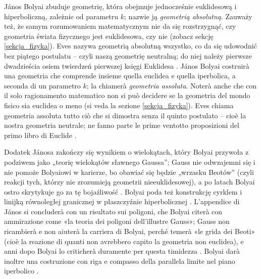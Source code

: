 János Bolyai zbuduje geometrię, która obejmuje jednocześnie euklidesową i hiperboliczną, zależnie od parametru $k$; nazwie ją \emph{geometrią absolutną}. %
Zauważy też, że samym rozumowaniem matematycznym nie da się rozstrzygnąć, czy geometria świata fizycznego jest euklidesowa, czy nie (zobacz sekcję \ref{sekcja_fizyka}). %
Eves nazywa geometrią absolutną wszystko, co da się udowodnić bez piątego postulatu -- czyli naszą geometrię neutralną; do niej należy pierwsze dwadzieścia osiem twierdzeń pierwszej księgi Euklidesa \cite[s. 288]{eves1_1972}. %
János Bolyai costruirà una geometria che comprende insieme quella euclidea e quella iperbolica, a seconda di un parametro $k$; la chiamerà \emph{geometria assoluta}. %
Noterà anche che con il solo ragionamento matematico non si può decidere se la geometria del mondo fisico sia euclidea o meno (si veda la sezione \ref{sekcja_fizyka}). %
Eves chiama geometria assoluta tutto ciò che si dimostra senza il quinto postulato -- cioè la nostra geometria neutrale; ne fanno parte le prime ventotto proposizioni del primo libro di Euclide \cite[p. 288]{eves1_1972}. %

Dodatek Jánosa zakończy się wynikiem o wielokątach, który Bolyai przywoła z podziwem jako „teorię wielokątów sławnego Gaussa''; Gauss nie odwzajemni się i nie pomoże Bolyaiowi w karierze, bo obawiać się będzie „wrzasku Beotów'' (czyli reakcji tych, którzy nie zrozumieją geometrii nieeuklidesowej), a po latach Bolyai ostro skrytykuje go za tę bojaźliwość \cite[s. 213]{greenberg_2010}. %
Bolyai poda też konstrukcję cyrklem i linijką równoległej granicznej w płaszczyźnie hiperbolicznej \cite[s. 210]{greenberg_2010}. %
L'appendice di János si concluderà con un risultato sui poligoni, che Bolyai citerà con ammirazione come «la teoria dei poligoni dell'illustre Gauss»; Gauss non ricambierà e non aiuterà la carriera di Bolyai, perché temerà «le grida dei Beoti» (cioè la reazione di quanti non avrebbero capito la geometria non euclidea), e anni dopo Bolyai lo criticherà duramente per questa timidezza \cite[p. 213]{greenberg_2010}. %
Bolyai darà inoltre una costruzione con riga e compasso della parallela limite nel piano iperbolico \cite[p. 210]{greenberg_2010}. %

